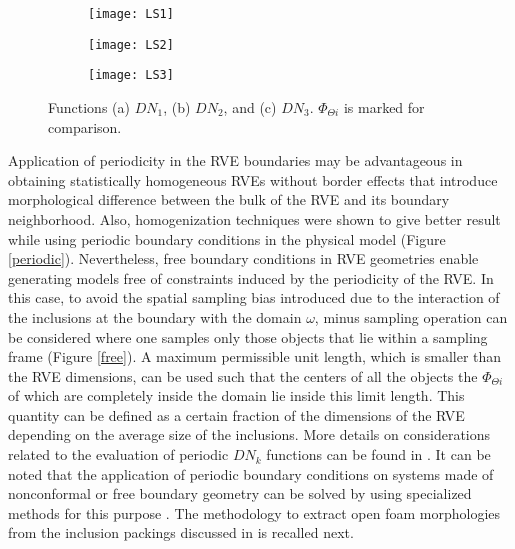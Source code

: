 \begin{figure}
	\centering

	\begin{subfigure}[t]{0.32\textwidth}
	\texttt{[image: LS1]}	
	\caption{}
	\end{subfigure}
	\begin{subfigure}[t]{0.32\textwidth}
	\texttt{[image: LS2]}	\label{dn2}
	\caption{}
	\end{subfigure}
	\begin{subfigure}[t]{0.32\textwidth}
	\texttt{[image: LS3]}	\label{dn3}
	\caption{}
	\end{subfigure}
	\caption{Functions (a) $DN_1$, (b) $DN_2$, and (c) $DN_3$. $ \Phi_{\Theta i}$ is marked for comparison.}\label{dn1}
\end{figure}

Application of periodicity in the RVE boundaries may be advantageous in obtaining statistically homogeneous RVEs without border effects that introduce morphological difference between the bulk of the RVE and its boundary neighborhood. Also, homogenization techniques were shown to give better result while using periodic boundary conditions in the physical model \cite{hollisterComparisonHomogenizationStandard1992}(Figure \ref{periodic}). Nevertheless, free boundary conditions in RVE geometries enable generating models free of constraints induced by the periodicity of the RVE. In this case, to avoid the spatial sampling bias introduced due to the interaction of the inclusions at the boundary with the domain $ \omega $, minus sampling operation\label{text-minus} \cite{baddeleySpatialSamplingCensoring1999} can be considered where one samples only those objects that lie within a sampling frame (Figure \ref{free}). A maximum permissible unit length, which is smaller than the RVE dimensions, can be used such that the centers of all the objects the $\Phi_{\Theta i} $ of which are completely inside the domain lie inside this limit length. This quantity can be defined as a certain fraction of the dimensions of the RVE depending on the average size of the inclusions. More details on considerations related to the evaluation of periodic $ DN_k $ functions can be found in \cite{sononAdvancedTechniquesGeneration2014}.  It can be noted that the application of periodic boundary conditions on systems made of nonconformal or free boundary geometry can be solved by using specialized methods for this purpose \cite{nguyenComputationalHomogenizationCellular2014}. The methodology to extract open foam morphologies from the inclusion packings discussed in \cite{sononAdvancedApproachGeneration2015} is recalled next.

